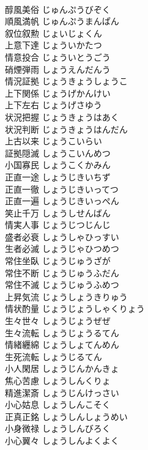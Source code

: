 \documentclass[8pt]{extreport}
\begin{document}
\begin{CJK}{UTF8}{min}
\\	醇風美俗	じゅんぷうびぞく	
\\	順風満帆	じゅんぷうまんぱん	
\\	叙位叙勲	じょいじょくん	
\\	上意下達	じょういかたつ	
\\	情意投合	じょういとうごう	
\\	硝煙弾雨	しょうえんだんう	
\\	情況証拠	じょうきょうしょうこ	
\\	上下関係	じょうげかんけい	
\\	上下左右	じょうげさゆう	
\\	状況把握	じょうきょうはあく	
\\	状況判断	じょうきょうはんだん	
\\	上古以来	じょうこいらい	
\\	証拠隠滅	しょうこいんめつ	
\\	小国寡民	しょうこくかみん	
\\	正直一途	しょうじきいちず	
\\	正直一徹	しょうじきいってつ	
\\	正直一遍	しょうじきいっぺん	
\\	笑止千万	しょうしせんばん	
\\	情実人事	じょうじつじんじ	
\\	盛者必衰	しょうしゃひっすい	
\\	生者必滅	しょうじゃひつめつ	
\\	常住坐臥	じょうじゅうざが	
\\	常住不断	じょうじゅうふだん	
\\	常住不滅	じょうじゅうふめつ	
\\	上昇気流	じょうしょうきりゅう	
\\	情状酌量	じょうじょうしゃくりょう	
\\	生々世々	しょうじょうぜぜ	
\\	生々流転	しょうじょうるてん	
\\	情緒纒綿	じょうしょてんめん	
\\	生死流転	しょうじるてん	
\\	小人閑居	しょうじんかんきょ	
\\	焦心苦慮	しょうしんくりょ	
\\	精進潔斎	しょうじんけっさい	
\\	小心姑息	しょうしんこそく	
\\	正真正銘	しょうしんしょうめい	
\\	小身微禄	しょうしんびろく	
\\	小心翼々	しょうしんよくよく	

\end{CJK}
\end{document}
